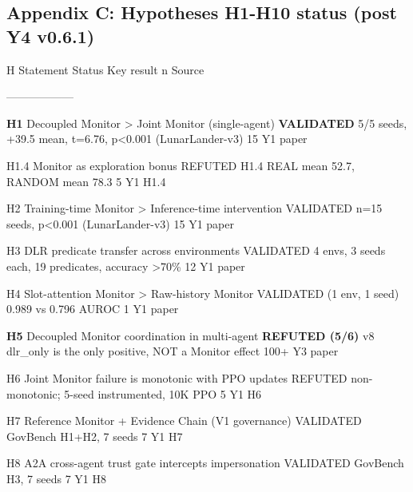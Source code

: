 \documentclass[
]{article}
\begin{document}
\subsection{Appendix C: Hypotheses H1-H10 status (post Y4
v0.6.1)}\label{appendix-c-hypotheses-h1-h10-status-post-y4-v0.6.1}

H \textbar{} Statement \textbar{} Status \textbar{} Key result
\textbar{} n \textbar{} Source \textbar{}

\textbar---\textbar---\textbar---\textbar---\textbar---\textbar---\textbar{}

\textbf{H1} \textbar{} Decoupled Monitor \textgreater{} Joint Monitor
(single-agent) \textbar{} \textbf{VALIDATED} \textbar{} 5/5 seeds, +39.5
mean, t=6.76, p\textless0.001 (LunarLander-v3) \textbar{} 15 \textbar{}
Y1 paper \textbar{}

H1.4 \textbar{} Monitor as exploration bonus \textbar{} REFUTED
\textbar{} H1.4 REAL mean 52.7, RANDOM mean 78.3 \textbar{} 5 \textbar{}
Y1 H1.4 \textbar{}

H2 \textbar{} Training-time Monitor \textgreater{} Inference-time
intervention \textbar{} VALIDATED \textbar{} n=15 seeds, p\textless0.001
(LunarLander-v3) \textbar{} 15 \textbar{} Y1 paper \textbar{}

H3 \textbar{} DLR predicate transfer across environments \textbar{}
VALIDATED \textbar{} 4 envs, 3 seeds each, 19 predicates, accuracy
\textgreater70\% \textbar{} 12 \textbar{} Y1 paper \textbar{}

H4 \textbar{} Slot-attention Monitor \textgreater{} Raw-history Monitor
\textbar{} VALIDATED (1 env, 1 seed) \textbar{} 0.989 vs 0.796 AUROC
\textbar{} 1 \textbar{} Y1 paper \textbar{}

\textbf{H5} \textbar{} Decoupled Monitor coordination in multi-agent
\textbar{} \textbf{REFUTED (5/6)} \textbar{} v8 dlr\_only is the only
positive, NOT a Monitor effect \textbar{} 100+ \textbar{} Y3 paper
\textbar{}

H6 \textbar{} Joint Monitor failure is monotonic with PPO updates
\textbar{} REFUTED \textbar{} non-monotonic; 5-seed instrumented, 10K
PPO \textbar{} 5 \textbar{} Y1 H6 \textbar{}

H7 \textbar{} Reference Monitor + Evidence Chain (V1 governance)
\textbar{} VALIDATED \textbar{} GovBench H1+H2, 7 seeds \textbar{} 7
\textbar{} Y1 H7 \textbar{}

H8 \textbar{} A2A cross-agent trust gate intercepts impersonation
\textbar{} VALIDATED \textbar{} GovBench H3, 7 seeds \textbar{} 7
\textbar{} Y1 H8 \textbar{}
\end{document}

